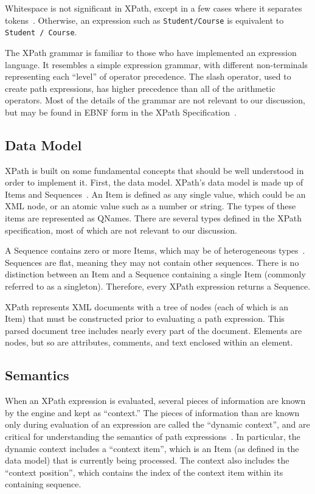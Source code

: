 \documentclass{scrartcl}
\begin{document}
Whitespace is not significant in XPath, except in a few cases where it separates
tokens~\cite{xpath}. Otherwise, an expression such as \texttt{Student/Course} is
equivalent to \texttt{Student / Course}.

The XPath grammar is familiar to those who have implemented an expression
language. It resembles a simple expression grammar, with different non-terminals
representing each ``level'' of operator precedence. The slash operator, used to
create path expressions, has higher precedence than all of the arithmetic
operators. Most of the details of the grammar are not relevant to our
discussion, but may be found in EBNF form in the XPath
Specification~\cite{xpath}.

\subsection{Data Model}

XPath is built on some fundamental concepts that should be well understood in
order to implement it. First, the data model. XPath's data model is made up of
Items and Sequences~\cite{xpath-datamodel}. An Item is defined as any single
value, which could be an XML node, or an atomic value such as a number or
string. The types of these items are represented as QNames. There are several
types defined in the XPath specification, most of which are not relevant to our
discussion.

A Sequence contains zero or more Items, which may be of heterogeneous
types~\cite{xpath-datamodel}. Sequences are flat, meaning they may not contain
other sequences. There is no distinction between an Item and a Sequence
containing a single Item (commonly referred to as a singleton). Therefore, every
XPath expression returns a Sequence.

XPath represents XML documents with a tree of nodes (each of which is an Item)
that must be constructed prior to evaluating a path expression. This parsed
document tree includes nearly every part of the document. Elements are nodes,
but so are attributes, comments, and text enclosed within an element.

\subsection{Semantics}

When an XPath expression is evaluated, several pieces of information are known
by the engine and kept as ``context.'' The pieces of information than are known
only during evaluation of an expression are called the ``dynamic context'', and
are critical for understanding the semantics of path expressions~\cite{xpath}.
In particular, the dynamic context includes a ``context item'', which is an Item
(as defined in the data model) that is currently being processed. The context
also includes the ``context position'', which contains the index of the context
item within its containing sequence.
\end{document}
